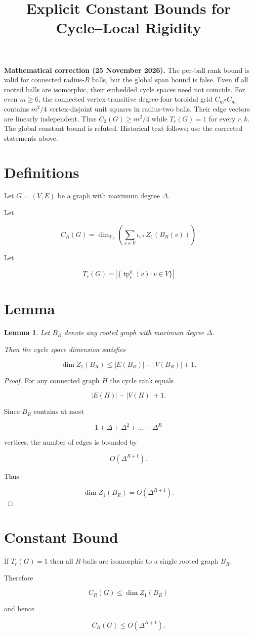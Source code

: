 \documentclass{article}
\newtheorem{lemma}{Lemma}
\begin{document}
\title{Explicit Constant Bounds for Cycle--Local Rigidity}
\date{}
\maketitle
\par\noindent\textbf{Mathematical correction (25 November 2026).} The per-ball rank bound is valid for connected radius-$R$ balls, but the global span bound is false. Even if all rooted balls are isomorphic, their embedded cycle spaces need not coincide. For even $m\ge6$, the connected vertex-transitive degree-four toroidal grid $C_m\square C_m$ contains $m^2/4$ vertex-disjoint unit squares in radius-two balls. Their edge vectors are linearly independent. Thus $C_2(G)\ge m^2/4$ while $T_r(G)=1$ for every $r,k$. The global constant bound is refuted. Historical text follows; use the corrected statements above.\par


\section*{Definitions}

Let $G=(V,E)$ be a graph with maximum degree $\Delta$.

Let

\[
C_R(G)=
\dim_{\mathbb F_2}
\left(
\sum_{v\in V}\iota_{v*}Z_1(B_R(v))
\right)
\]

Let

\[
T_r(G)=
\left|
\{
\operatorname{tp}^k_r(v):v\in V
\}
\right|
\]

\section*{Lemma}

\begin{lemma}
Let $B_R$ denote any rooted graph with maximum degree $\Delta$.

Then the cycle space dimension satisfies

\[
\dim Z_1(B_R) \le |E(B_R)| - |V(B_R)| + 1.
\]

\end{lemma}

\begin{proof}

For any connected graph $H$ the cycle rank equals

\[
|E(H)|-|V(H)|+1.
\]

Since $B_R$ contains at most

\[
1+\Delta+\Delta^2+\dots+\Delta^R
\]

vertices, the number of edges is bounded by

\[
O(\Delta^{R+1}).
\]

Thus

\[
\dim Z_1(B_R) = O(\Delta^{R+1}).
\]

\end{proof}

\section*{Constant Bound}

If $T_r(G)=1$ then all $R$-balls are isomorphic to a single rooted
graph $B_R$.

Therefore

\[
C_R(G)\le \dim Z_1(B_R)
\]

and hence

\[
C_R(G) \le O(\Delta^{R+1}).
\]
\end{document}
